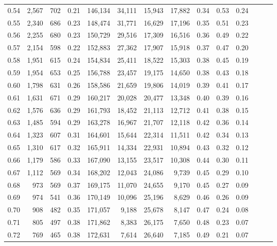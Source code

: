 \begin{tabular}{rrrrrrrrrrrrrr}
0.54 &  2,567 &  702 &  0.21 &  146,134 &   34,111 &  15,943 &  17,882 &  0.34 &  0.53 &      0.24 \\
0.55 &  2,340 &  686 &  0.23 &  148,474 &   31,771 &  16,629 &  17,196 &  0.35 &  0.51 &      0.23 \\
0.56 &  2,255 &  680 &  0.23 &  150,729 &   29,516 &  17,309 &  16,516 &  0.36 &  0.49 &      0.22 \\
0.57 &  2,154 &  598 &  0.22 &  152,883 &   27,362 &  17,907 &  15,918 &  0.37 &  0.47 &      0.20 \\
0.58 &  1,951 &  615 &  0.24 &  154,834 &   25,411 &  18,522 &  15,303 &  0.38 &  0.45 &      0.19 \\
0.59 &  1,954 &  653 &  0.25 &  156,788 &   23,457 &  19,175 &  14,650 &  0.38 &  0.43 &      0.18 \\
0.60 &  1,798 &  631 &  0.26 &  158,586 &   21,659 &  19,806 &  14,019 &  0.39 &  0.41 &      0.17 \\
0.61 &  1,631 &  671 &  0.29 &  160,217 &   20,028 &  20,477 &  13,348 &  0.40 &  0.39 &      0.16 \\
0.62 &  1,576 &  636 &  0.29 &  161,793 &   18,452 &  21,113 &  12,712 &  0.41 &  0.38 &      0.15 \\
0.63 &  1,485 &  594 &  0.29 &  163,278 &   16,967 &  21,707 &  12,118 &  0.42 &  0.36 &      0.14 \\
0.64 &  1,323 &  607 &  0.31 &  164,601 &   15,644 &  22,314 &  11,511 &  0.42 &  0.34 &      0.13 \\
0.65 &  1,310 &  617 &  0.32 &  165,911 &   14,334 &  22,931 &  10,894 &  0.43 &  0.32 &      0.12 \\
0.66 &  1,179 &  586 &  0.33 &  167,090 &   13,155 &  23,517 &  10,308 &  0.44 &  0.30 &      0.11 \\
0.67 &  1,112 &  569 &  0.34 &  168,202 &   12,043 &  24,086 &   9,739 &  0.45 &  0.29 &      0.10 \\
0.68 &    973 &  569 &  0.37 &  169,175 &   11,070 &  24,655 &   9,170 &  0.45 &  0.27 &      0.09 \\
0.69 &    974 &  541 &  0.36 &  170,149 &   10,096 &  25,196 &   8,629 &  0.46 &  0.26 &      0.09 \\
0.70 &    908 &  482 &  0.35 &  171,057 &    9,188 &  25,678 &   8,147 &  0.47 &  0.24 &      0.08 \\
0.71 &    805 &  497 &  0.38 &  171,862 &    8,383 &  26,175 &   7,650 &  0.48 &  0.23 &      0.07 \\
0.72 &    769 &  465 &  0.38 &  172,631 &    7,614 &  26,640 &   7,185 &  0.49 &  0.21 &      0.07 \\

\end{tabular}
